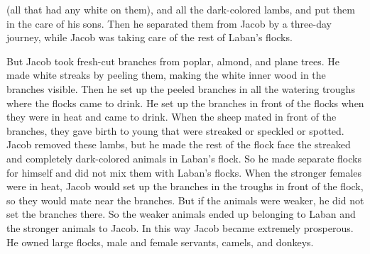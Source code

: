 {(all
that had
any white
on them), and all
the dark-colored
lambs,
and put
them in the care
of his
sons.
Then he separated
them from Jacob
by a three-day
journey,
while Jacob
was taking care
of the rest
of Laban’s
flocks.
\par }{\PP {}But Jacob
took
fresh-cut
branches
from poplar,
almond,
and plane trees.
He made
white
streaks
by peeling them, making the white
inner wood in
the branches
visible.
Then he set up
the peeled
branches
in all the watering
troughs
where
the flocks
came
to drink.
He set up the branches
in front of
the flocks
when they were in heat
and came
to drink.
When the sheep
mated
in front of the branches,
they gave birth
to young that were streaked
or speckled
or spotted.
Jacob
removed
these lambs,
but he made
the rest of the flock
face
the streaked
and completely
dark-colored
animals in Laban’s
flock.
So he made separate flocks
for himself
and did not
mix them with Laban’s
flocks.
When
the stronger
females
were in heat,
Jacob
would set up
the branches
in the troughs
in front
of the flock,
so they would mate
near the branches.
But if the animals were weaker,
he did not
set
the branches there. So the weaker
animals ended up belonging to Laban
and the stronger
animals to Jacob.
In this way Jacob became
extremely
prosperous.
He owned
large
flocks,
male
and female
servants,
camels,
and donkeys.

}

